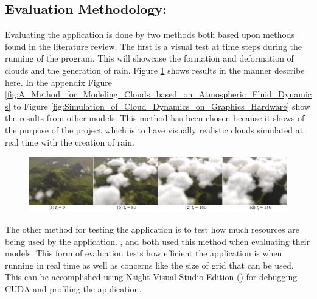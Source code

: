 \subsection{Evaluation Methodology:}
\label{eval_meth}

Evaluating the application is done by two methods both based upon methods found in the literature review.
The first is a visual test at time steps during the running of the program.
This will showcase the formation and deformation of clouds and the generation of rain.
Figure \ref{fig:Simple Realistic Animation of Clouds} shows \citet{DobashiEtAl00} results in the manner describe here.
In the appendix Figure \ref{fig:A_Method_for_Modeling_Clouds_based_on_Atmospheric_Fluid_Dynamics} to Figure \ref{fig:Simulation_of_Cloud_Dynamics_on_Graphics_Hardware} show the results from other models.
This method has been chosen because it shows of the purpose of the project which is to have visually realistic clouds simulated at real time with the creation of rain.

\begin{figure}[h!]
  \centering
  \includegraphics[width=\textwidth]{images/Simple_Realistic_Animation_of_Clouds.PNG}
  \caption{\citet{DobashiEtAl00}}
  \label{fig:Simple Realistic Animation of Clouds}
\end{figure}

The other method for testing the application is to test how much resources are being used by the application.
\citet*{MHarris01}, and \citet{Elek12} both used this method when evaluating their models.
This form of evaluation tests how efficient the application is when running in real time as well as concerns like the size of grid that can be used.
This can be accomplished using Nsight Visual Studio Edition (\citeyear{nvidiasight2013}) for debugging CUDA and profiling the application.